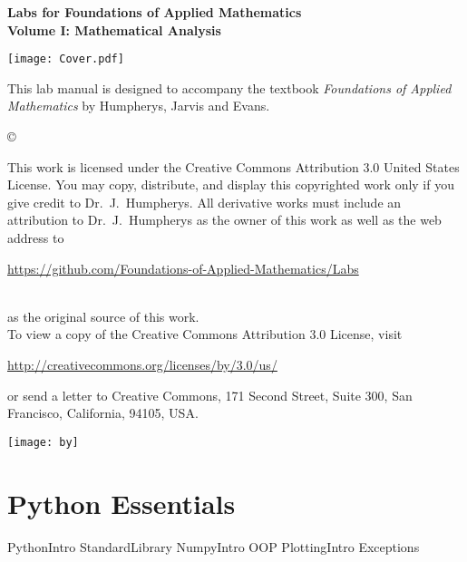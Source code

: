 \documentclass[nociteref]{SIAM-GH-book}
\begin{document}

\thispagestyle{empty} %

\begin{center}
{\huge \bf Labs for Foundations of Applied Mathematics} \\
\vspace{5mm}
{\Large \bf Volume I: Mathematical Analysis}
\vspace{20mm}

\texttt{[image: Cover.pdf]}
\end{center}
\frontmatter



\begin{thepreface} %

This lab manual is designed to accompany the textbook \emph{Foundations of Applied Mathematics} by Humpherys, Jarvis and Evans.

\vfill
\copyright{This work is licensed under the Creative Commons Attribution 3.0 United States
License.  You may copy, distribute, and display this copyrighted work only if you give
credit to Dr.~J.~Humpherys. All derivative works must include an attribution to Dr.~J.~Humpherys as the owner of this work as well as the web address to
\\\centerline{\url{https://github.com/Foundations-of-Applied-Mathematics/Labs}}\\as the original source of this work.
\\To view a copy of the Creative Commons Attribution 3.0 License, visit
\\\centerline{\url{http://creativecommons.org/licenses/by/3.0/us/}} or send a letter to Creative Commons, 171 Second Street, Suite 300, San Francisco, California, 94105, USA.}

\vfill
\centering\texttt{[image: by]}
\vfill
\end{thepreface}

\setcounter{tocdepth}{1}
\tableofcontents

\mainmatter %

\part{Python Essentials} %
{PythonIntro}
{StandardLibrary}
{NumpyIntro}
{OOP}
{PlottingIntro}
{Exceptions}
\end{document}
